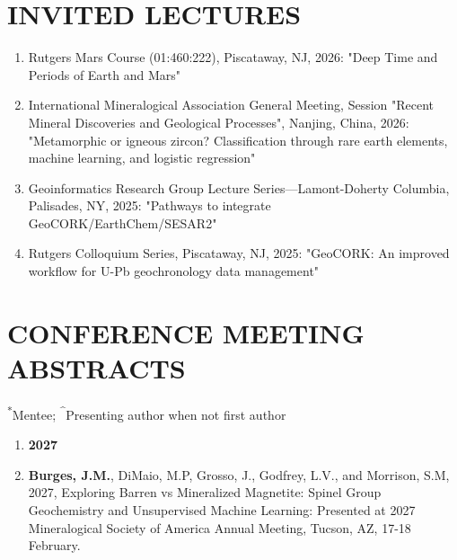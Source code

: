 \documentclass{res} %
\newcommand\reverselabel[1]{%
  \def\theenumi{}%
  \renewcommand\makelabel[1]{%
    \def\tmp{##1}%
    \ifx\tmp\empty
      \null
    \else
      \makebox[\dimexpr\labelwidth-3pt\relax][r]{%
        \the\numexpr#1-\value{enumi}+1\relax.}%
    \fi}}
\begin{document}
\begin{resume}
\begin{itemize}
\end{itemize}


\section{\Large{INVITED LECTURES}}

\begin{enumerate}
\reverselabel{4}
  \item Rutgers Mars Course (01:460:222), Piscataway, NJ, 2026: "Deep Time and Periods of Earth and Mars"
  \item International Mineralogical Association General Meeting, Session "Recent Mineral Discoveries and Geological Processes", Nanjing, China, 2026: "Metamorphic or igneous zircon? Classification through rare earth elements, machine learning, and logistic regression"
  \item Geoinformatics Research Group Lecture Series—Lamont-Doherty Columbia, Palisades, NY, 2025: "Pathways to integrate GeoCORK/EarthChem/SESAR2"
  \item Rutgers Colloquium Series, Piscataway, NJ, 2025: "GeoCORK: An improved workflow for U-Pb geochronology data management"
\end{enumerate}



\section{\Large{CONFERENCE MEETING ABSTRACTS}}
\medskip
\noindent
\textsuperscript{*}Mentee;
\textsuperscript{\textasciicircum}Presenting author when not first author
\par\medskip

\begin{enumerate}
\reverselabel{30}

\item[] \hspace*{-24pt}\textbf{\large 2027}

\item \textbf{Burges, J.M.}, DiMaio, M.P, Grosso, J., Godfrey, L.V., and Morrison, S.M, 2027, Exploring Barren vs Mineralized Magnetite: Spinel Group Geochemistry and Unsupervised Machine Learning: Presented at 2027 Mineralogical Society of America Annual Meeting, Tucson, AZ, 17-18 February.


\end{enumerate}
\end{resume}
\end{document}
